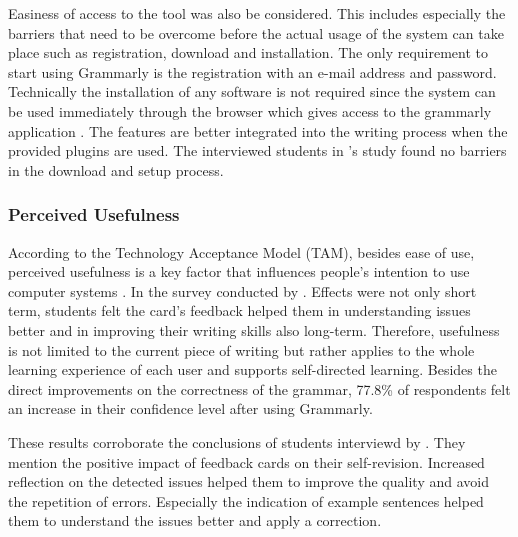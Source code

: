 \documentclass[runningheads]{llncs}
\let\OldTextregistered\textregistered
\renewcommand{\textregistered}{\OldTextregistered\xspace}%
\begin{document}
Easiness of access to the tool was also be considered. This includes especially the barriers that need to be overcome before the actual usage of the system can take place such as registration, download and installation. The only requirement to start using Grammarly\textregistered is the registration with an e-mail address and password. Technically the installation of any software is not required since the system can be used immediately through the browser which gives access to the grammarly application \citep{noauthor_write_nodate}. The features are better integrated into the writing process when the provided plugins are used. The interviewed students in \citeauthor{nova_utilizing_2018}'s study found no barriers in the download and setup process.

\subsubsection{Perceived Usefulness} 
According to the Technology Acceptance Model (TAM), besides ease of use, perceived usefulness is a key factor that influences people's intention to use computer systems \citep{davis_user_1989}. In the survey conducted by \citeauthor{cavaleri_you_2016} . Effects were not only short term, students felt the card's feedback helped them in understanding issues better and in improving their writing skills also long-term. Therefore, usefulness is not limited to the current piece of writing but rather applies to the whole learning experience of each user and supports self-directed learning. Besides the direct improvements on the correctness of the grammar, 77.8\% of respondents felt an increase in their confidence level after using Grammarly\textregistered. 

These results corroborate the conclusions of students interviewd by \textcite{nova_utilizing_2018}. They mention the positive impact of feedback cards on their self-revision. Increased reflection on the detected issues helped them to improve the quality and avoid the repetition of errors. Especially the indication of example sentences helped them to understand the issues better and apply a correction.
\end{document}
